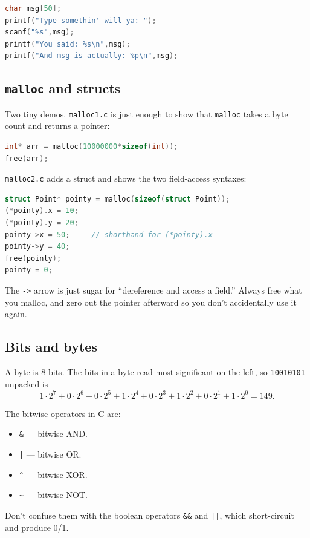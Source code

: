 \documentclass[11pt]{article}
\begin{document}
\begin{lstlisting}[language=C]
char msg[50];
printf("Type somethin' will ya: ");
scanf("%s",msg);
printf("You said: %s\n",msg);
printf("And msg is actually: %p\n",msg);
\end{lstlisting}

\subsection*{\texttt{malloc} and structs}

Two tiny demos. \texttt{malloc1.c} is just enough to show that
\texttt{malloc} takes a byte count and returns a pointer:

\begin{lstlisting}[language=C]
int* arr = malloc(10000000*sizeof(int));
free(arr);
\end{lstlisting}

\texttt{malloc2.c} adds a struct and shows the two field-access
syntaxes:

\begin{lstlisting}[language=C]
struct Point* pointy = malloc(sizeof(struct Point));
(*pointy).x = 10;
(*pointy).y = 20;
pointy->x = 50;     // shorthand for (*pointy).x
pointy->y = 40;
free(pointy);
pointy = 0;
\end{lstlisting}

The \texttt{->} arrow is just sugar for ``dereference and access a
field.'' Always free what you malloc, and zero out the pointer
afterward so you don't accidentally use it again.

\subsection*{Bits and bytes}

A byte is 8 bits. The bits in a byte read most-significant on the
left, so \texttt{10010101} unpacked is
\[
  1 \cdot 2^7 + 0 \cdot 2^6 + 0 \cdot 2^5 + 1 \cdot 2^4
  + 0 \cdot 2^3 + 1 \cdot 2^2 + 0 \cdot 2^1 + 1 \cdot 2^0 = 149.
\]

The bitwise operators in C are:
\begin{itemize}
  \item \texttt{\&} --- bitwise AND.
  \item \texttt{|} --- bitwise OR.
  \item \texttt{\^{}} --- bitwise XOR.
  \item \texttt{\textasciitilde{}} --- bitwise NOT.
\end{itemize}
Don't confuse them with the boolean operators \texttt{\&\&} and
\texttt{||}, which short-circuit and produce 0/1.
\end{document}
